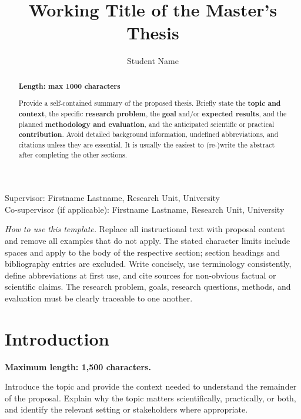 \documentclass[runningheads]{llncs}
\begin{document}
%
\title{Working Title of the Master's Thesis}
%
%
\author{Student Name}
%
%
%
\maketitle
%
Supervisor: Firstname Lastname, Research Unit, University \\
Co-supervisor (if applicable): Firstname Lastname, Research Unit, University

\medskip
\noindent\textit{How to use this template.}
Replace all instructional text with proposal content and remove all examples
that do not apply. The stated character limits include spaces and
apply to the body of the respective section; section headings and bibliography
entries are excluded. Write concisely, use terminology consistently, define
abbreviations at first use, and cite sources for non-obvious factual or
scientific claims. The research problem, goals, research questions, methods,
and evaluation must be clearly traceable to one another.

\begin{abstract}
\textbf{Length: max 1000 characters}

Provide a self-contained summary of the proposed thesis. Briefly state the
\textbf{topic and context}, the specific \textbf{research problem}, the \textbf{goal} and/or \textbf{expected results}, and the planned \textbf{methodology and evaluation}, and the anticipated scientific or practical \textbf{contribution}. Avoid detailed background information, undefined abbreviations, and citations unless they are essential. It is usually the easiest to (re-)write the abstract after completing the other sections.

\end{abstract}
%
\section{Introduction}
\textbf{Maximum length: 1,500 characters.}

Introduce the topic and provide the context needed to understand the remainder
of the proposal. Explain why the topic matters scientifically, practically, or
both, and identify the relevant setting or stakeholders where appropriate.
\end{document}
